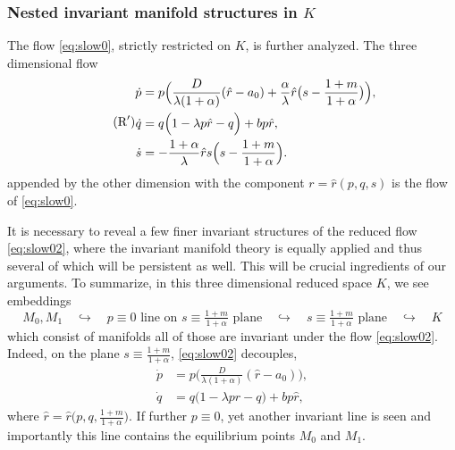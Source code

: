\documentclass[a4paper,11pt]{article}
\theoremstyle{remark}
\begin{document}
\subsubsection{Nested invariant manifold structures in $K$}
The flow \eqref{eq:slow0}, strictly restricted on $K$, is further analyzed. The three dimensional flow
\begin{equation}\label{eq:slow02} \tag{$\text{R}^\prime$}
 \begin{aligned}
 \dot{p} &= p\Big(\frac{D}{\lambda(1+\alpha)}(\hat{r}-a_0) + \frac{\alpha}{\lambda}\hat{r}\big(s- \frac{1+m}{1+\alpha}\big) \Big),\\
 \dot{q} &=q\Big(1 -\lambda p \hat{r} -q\Big) + b p \hat{r},\\%
 \dot{s} &= -\frac{1+\alpha}{\lambda}\hat{r}s\Big(s- \frac{1+m}{1+\alpha}\Big).
 \end{aligned}
\end{equation}
appended by the other dimension with the component $r=\hat{r}(p,q,s)$ is the flow of \eqref{eq:slow0}. 

It is necessary to reveal a few finer invariant structures of the reduced flow \eqref{eq:slow02}, where the invariant manifold theory is equally applied and thus several of which will be persistent as well. This will be crucial ingredients of our arguments. To summarize, in this three dimensional reduced space $K$, we see embeddings 
$$ M_0, M_1 \quad \hookrightarrow \quad \text{$p\equiv0$ line on $s\equiv\tfrac{1+m}{1+\alpha}$ plane} \quad \hookrightarrow \quad \text{$s\equiv\tfrac{1+m}{1+\alpha}$ plane} \quad \hookrightarrow \quad K$$
which consist of manifolds all of those are invariant under the flow \eqref{eq:slow02}. Indeed, on the plane $s\equiv\tfrac{1+m}{1+\alpha}$, \eqref{eq:slow02} decouples,
\begin{equation}\label{eq:slow03}
 \begin{aligned}
 \dot{p} &= p\Big(\frac{D}{\lambda(1+\alpha)}(\hat{r}-a_0)\Big),\\
 \dot{q} &= q\Big(1 -\lambda p \hat{r} -q\Big) + b p \hat{r}, 
 \end{aligned}
\end{equation}
where $\hat{r}=\hat{r}\big(p,q,\frac{1+m}{1+\alpha}\big)$. If further $p\equiv0$, yet another invariant line is seen and importantly this line contains the equilibrium points $M_0$ and $M_1$.
\end{document}
